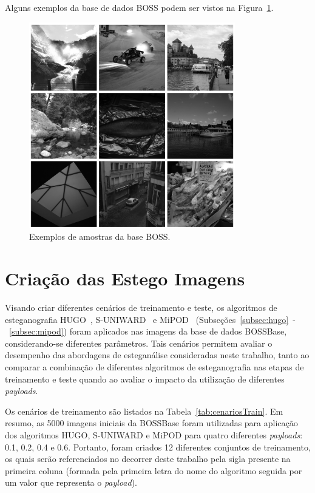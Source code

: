 Alguns exemplos da base de dados BOSS podem ser vistos na Figura~\ref{fig:bossexample}.

\begin{figure}[h]
	\center
	\includegraphics[width=0.8\textwidth]{dados/figuras/exemplo-boss.png}
	\caption{Exemplos de amostras da base BOSS.}
	\label{fig:bossexample}
\end{figure}

\section{Criação das Estego Imagens}
\label{sec:impl-alg}

Visando criar diferentes cenários de treinamento e teste, os algoritmos de esteganografia HUGO~\cite{hugo}, S-UNIWARD~\cite{holub2014universal} e MiPOD~\cite{sedighi2016content} (Subseções~\ref{subsec:hugo}~-~\ref{subsec:mipod}) foram aplicados nas imagens da base de dados BOSSBase, considerando-se diferentes parâmetros. Tais cenários permitem avaliar o desempenho das abordagens de esteganálise consideradas neste trabalho, tanto ao comparar a combinação de diferentes algoritmos de esteganografia nas etapas de treinamento e teste quando ao avaliar o impacto da utilização de diferentes \textit{payloads}.

Os cenários de treinamento são listados na Tabela~\ref{tab:cenariosTrain}. Em resumo, as 5000 imagens iniciais da BOSSBase foram utilizadas para aplicação dos algoritmos HUGO, S-UNIWARD e MiPOD para quatro diferentes \textit{payloads}: 0.1, 0.2, 0.4 e 0.6. Portanto, foram criados 12 diferentes conjuntos de treinamento, os quais serão referenciados no decorrer deste trabalho pela sigla presente na primeira coluna (formada pela primeira letra do nome do algoritmo seguida por um valor que representa o \textit{payload}).


